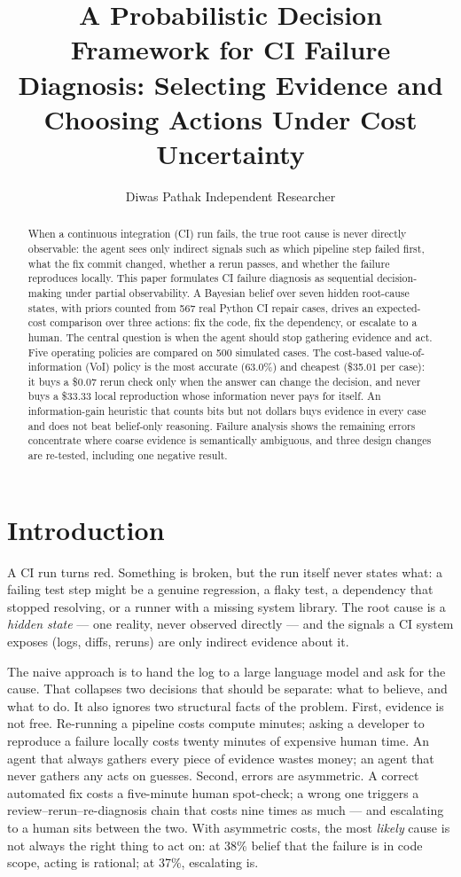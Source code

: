 \documentclass{article}
\title{A Probabilistic Decision Framework for CI Failure Diagnosis: Selecting Evidence and Choosing Actions Under Cost Uncertainty}
\author{
    Diwas Pathak
    \affiliations
    Independent Researcher
}
\begin{document}
\maketitle

\begin{abstract}
When a continuous integration (CI) run fails, the true root cause is never directly observable: the agent sees only indirect signals such as which pipeline step failed first, what the fix commit changed, whether a rerun passes, and whether the failure reproduces locally. This paper formulates CI failure diagnosis as sequential decision-making under partial observability. A Bayesian belief over seven hidden root-cause states, with priors counted from 567 real Python CI repair cases, drives an expected-cost comparison over three actions: fix the code, fix the dependency, or escalate to a human. The central question is when the agent should stop gathering evidence and act. Five operating policies are compared on 500 simulated cases. The cost-based value-of-information (VoI) policy is the most accurate (63.0\%) and cheapest (\$35.01 per case): it buys a \$0.07 rerun check only when the answer can change the decision, and never buys a \$33.33 local reproduction whose information never pays for itself. An information-gain heuristic that counts bits but not dollars buys evidence in every case and does not beat belief-only reasoning. Failure analysis shows the remaining errors concentrate where coarse evidence is semantically ambiguous, and three design changes are re-tested, including one negative result.
\end{abstract}

\section{Introduction}

A CI run turns red. Something is broken, but the run itself never states what: a failing test step might be a genuine regression, a flaky test, a dependency that stopped resolving, or a runner with a missing system library. The root cause is a \emph{hidden state} --- one reality, never observed directly --- and the signals a CI system exposes (logs, diffs, reruns) are only indirect evidence about it.

The naive approach is to hand the log to a large language model and ask for the cause. That collapses two decisions that should be separate: what to believe, and what to do. It also ignores two structural facts of the problem. First, evidence is not free. Re-running a pipeline costs compute minutes; asking a developer to reproduce a failure locally costs twenty minutes of expensive human time. An agent that always gathers every piece of evidence wastes money; an agent that never gathers any acts on guesses. Second, errors are asymmetric. A correct automated fix costs a five-minute human spot-check; a wrong one triggers a review--rerun--re-diagnosis chain that costs nine times as much --- and escalating to a human sits between the two. With asymmetric costs, the most \emph{likely} cause is not always the right thing to act on: at 38\% belief that the failure is in code scope, acting is rational; at 37\%, escalating is.
\end{document}

